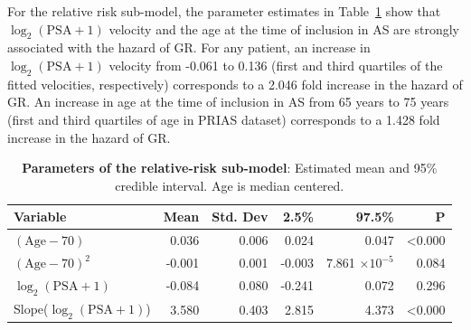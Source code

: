 \begin{subappendices}


For the relative risk sub-model, the parameter estimates in Table~\ref{c2:table:app1} show that ${\log_2 (\mbox{PSA} + 1)}$ velocity and the age at the time of inclusion in AS are strongly associated with the hazard of GR. For any patient, an increase in $\log_2 (\mbox{PSA} + 1)$ velocity from -0.061 to 0.136 (first and third quartiles of the fitted velocities, respectively) corresponds to a 2.046 fold increase in the hazard of GR. An increase in age at the time of inclusion in AS from 65 years to 75 years (first and third quartiles of age in PRIAS dataset) corresponds to a 1.428 fold increase in the hazard of GR.

\begin{table}
\small
\centering
\caption{\textbf{Parameters of the relative-risk sub-model}: Estimated mean and 95\% credible interval. Age is median centered.}
\label{c2:table:app1}
\begin{tabular}{lrrrrr}
\toprule
Variable                      & Mean   & Std. Dev & 2.5\%  & 97.5\%                 & P              \\ 
\midrule
$(\mbox{Age} - 70)$                  & 0.036 & 0.006 & 0.024 & 0.047 & \textless0.000 \\
$(\mbox{Age} - 70)^2$   & -0.001 & 0.001 & -0.003 & 7.861 $\times 10^{-5}$ & 0.084          \\
$\log_2 (\mbox{PSA} + 1)$                  & -0.084 & 0.080 & -0.241 & 0.072 & 0.296         \\
Slope($\log_2 (\mbox{PSA} + 1)$)           & 3.580 & 0.403 & 2.815 & 4.373 & \textless0.000 \\
\bottomrule
\end{tabular}
\end{table}


\end{subappendices}
